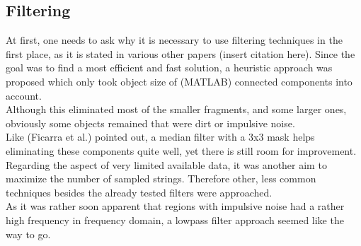 \documentclass{article}
\begin{document}
\subsection{Filtering}\label{sec:Filtering}
At first, one needs to ask why it is necessary to use filtering techniques in the first place, as it is stated in various other papers (insert citation here). Since the goal was to find a most efficient and fast solution, a heuristic approach was proposed which only took object size of (MATLAB) connected components into account.\\
Although this eliminated most of the smaller fragments, and some larger ones, obviously some objects remained that were dirt or impulsive noise. \\
Like (Ficarra et al.) pointed out, a median filter with a 3x3 mask helps eliminating these components quite well, yet there is still room for improvement. Regarding the aspect of very limited available data, it was another aim to maximize the number of sampled strings. Therefore other, less common techniques besides the already tested filters were approached.\\
As it was rather soon apparent that regions with impulsive noise had a rather high frequency in frequency domain, a lowpass filter approach seemed like the way to go.

\end{document}
